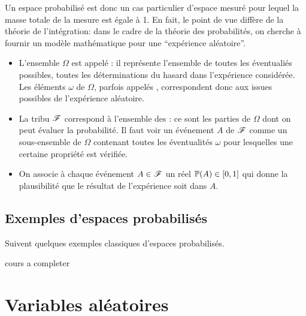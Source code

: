 \begin{interp}
    Un espace probabilisé est donc un cas particulier d'espace mesuré
    pour lequel la masse totale de la mesure est égale à 1. En fait,
    le point de vue diffère de la théorie de l'intégration: dans
    le cadre de la théorie des probabilités, on cherche à fournir
    un modèle mathématique pour une ``expérience aléatoire''.

    \begin{itemize}
        \item L'ensemble \(\Omega\) est appelé :
        il représente l'ensemble de toutes les éventualiés possibles,
        toutes les déterminations du hasard dans l'expérience considérée.
        Les éléments \(\omega\) de \(\Omega\), parfois appelés
        , correspondent donc aux issues
        possibles de l'expérience aléatoire.

        \item La tribu \(\mathscr{F}\) correspond à l'ensemble des
        :  ce sont les parties de \(\Omega\) dont
        on peut évaluer la probabilité. Il faut voir un événement
        \(A\) de \(\mathscr{F}\) comme un sous-ensemble de \(\Omega\) 
        contenant toutes les éventualités \(\omega\) pour
        lesquelles une certaine propriété est vérifiée.

        \item On associe à chaque événement \(A\in\mathscr{F}\) un réel
        \(\mathbb{P}(A) \in \mathopen{}\left[0,1\right]\mathclose{}\) qui donne la plausibilité que
        le résultat de l'expérience soit dans \(A\).
    \end{itemize}
\end{interp}

\subsection{Exemples d'espaces probabilisés}\label{subsubsec:1-2}
Suivent quelques exemples classiques d'espaces probabilisés.

\begin{exs}[]
    cours a completer
\end{exs}


\section{Variables aléatoires}\label{subsec:2}

